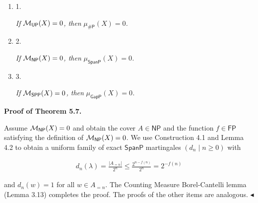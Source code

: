 \documentclass[10pt,a4paper]{article}
\begin{document}
\begin{enumerate}


\item[] 
1. 


\emph{If }${{\cal M}_{\mathsf{UP}}}(X)=0$\emph{, then }$\mu_{\mathsf{\#}\mathsf{P}}(X)=0$\emph{.}\par





\item[] 
2. 


\emph{If }${{\cal M}_{\mathsf{NP}}}(X)=0$\emph{, then }$\mu_{\mathsf{SpanP}}(X)=0$\emph{.}\par





\item[] 
3. 


\emph{If }${{\cal M}_{\mathsf{SPP}}}(X)=0$\emph{, then }$\mu_{\mathsf{GapP}}(X)=0$\emph{.}\par





\end{enumerate}







\par\medskip\noindent\textbf{Proof of Theorem 5.7.}\par




Assume ${{\cal M}_{\mathsf{NP}}}(X)=0$ and obtain the cover $A\in\mathsf{NP}$ and the function $f\in\mathsf{FP}$ satisfying the definition of ${{\cal M}_{\mathsf{NP}}}(X)=0$.
We use Construction 4.1 and Lemma 4.2 to obtain a uniform family of exact $\mathsf{SpanP}$ martingales $(d_{n}\mid n\geq 0)$ with\par


\[\begin{gathered}
d_{n}(\lambda)=\frac{|A_{=n}|}{2^{n}}\leq\frac{2^{n-f(n)}}{2^{n}}=2^{-f(n)}
\end{gathered}\]


and
$d_{n}(w)=1$ for all $w\in A_{=n}$.
The Counting Measure Borel-Cantelli lemma (Lemma 3.13) completes the proof. The proofs of the other items are analogous.
$\blacktriangleleft$\par
\end{document}
